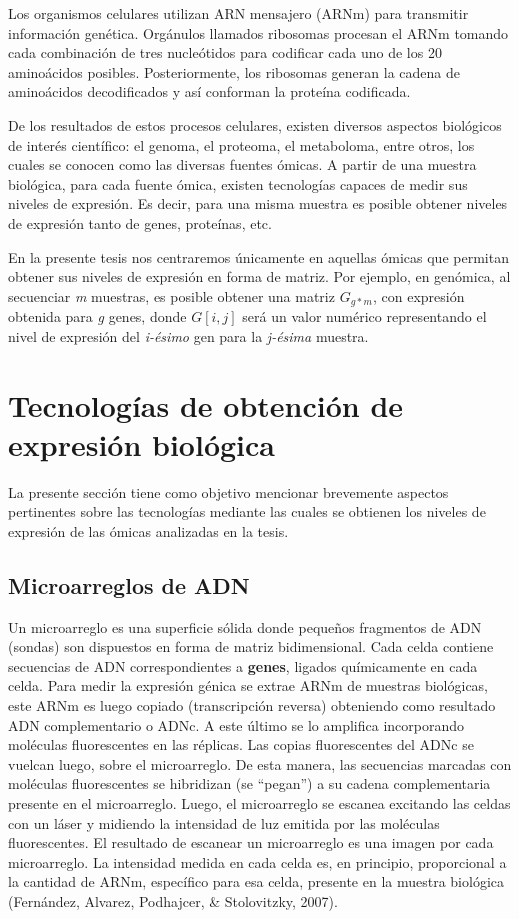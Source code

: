 \documentclass[12pt,twoside]{reedthesis}
\begin{document}
Los organismos celulares utilizan ARN mensajero (ARNm) para transmitir información genética. Orgánulos llamados ribosomas procesan el ARNm tomando cada combinación de tres nucleótidos para codificar cada uno de los 20 aminoácidos posibles. Posteriormente, los ribosomas generan la cadena de aminoácidos decodificados y así conforman la proteína codificada.

De los resultados de estos procesos celulares, existen diversos aspectos biológicos de interés científico: el genoma, el proteoma, el metaboloma, entre otros, los cuales se conocen como las diversas fuentes ómicas. A partir de una muestra biológica, para cada fuente ómica, existen tecnologías capaces de medir sus niveles de expresión. Es decir, para una misma muestra es posible obtener niveles de expresión tanto de genes, proteínas, etc.

En la presente tesis nos centraremos únicamente en aquellas ómicas que permitan obtener sus niveles de expresión en forma de matriz. Por ejemplo, en genómica, al secuenciar \emph{m} muestras, es posible obtener una matriz \(G_{g*m}\), con expresión obtenida para \emph{g} genes, donde \(G[i,j]\) será un valor numérico representando el nivel de expresión del \emph{i-ésimo} gen para la \emph{j-ésima} muestra.

\hypertarget{sec:technols}{%
\section{Tecnologías de obtención de expresión biológica}\label{sec:technols}}

La presente sección tiene como objetivo mencionar brevemente aspectos pertinentes sobre las tecnologías mediante las cuales se obtienen los niveles de expresión de las ómicas analizadas en la tesis.

\hypertarget{microarreglos-de-adn}{%
\subsection{Microarreglos de ADN}\label{microarreglos-de-adn}}

Un microarreglo es una superficie sólida donde pequeños fragmentos de ADN (sondas) son dispuestos en forma de matriz bidimensional. Cada celda contiene secuencias de ADN correspondientes a \textbf{genes}, ligados químicamente en cada celda. Para medir la expresión génica se extrae ARNm de muestras biológicas, este ARNm es luego copiado (transcripción reversa) obteniendo como resultado ADN complementario o ADNc. A este último se lo amplifica incorporando moléculas fluorescentes en las réplicas. Las copias fluorescentes del ADNc se vuelcan luego, sobre el microarreglo. De esta manera, las secuencias marcadas con moléculas fluorescentes se hibridizan (se ``pegan'') a su cadena complementaria presente en el microarreglo. Luego, el microarreglo se escanea excitando las celdas con un láser y midiendo la intensidad de luz emitida por las moléculas fluorescentes. El resultado de escanear un microarreglo es una imagen por cada microarreglo. La intensidad medida en cada celda es, en principio, proporcional a la cantidad de ARNm, específico para esa celda, presente en la muestra biológica (Fernández, Alvarez, Podhajcer, \& Stolovitzky, 2007).
\end{document}
